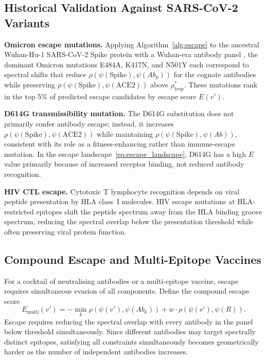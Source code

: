 \documentclass[twocolumn,11pt,a4paper]{article}
\theoremstyle{definition}
\theoremstyle{remark}
\begin{document}
\subsection{Historical Validation Against SARS-CoV-2 Variants}

\noindent\textbf{Omicron escape mutations.} Applying
Algorithm~\ref{alg:escape} to the ancestral Wuhan-Hu-1 SARS-CoV-2 Spike
protein with a Wuhan-era antibody panel \citep{cameroni2022}, the dominant
Omicron mutations E484A, K417N, and N501Y each correspond to spectral shifts
that reduce $\rho(\psi(\text{Spike}), \psi(Ab_k))$ for the cognate antibodies
while preserving $\rho(\psi(\text{Spike}), \psi(\text{ACE2}))$ above
$\rho^*_{\text{trop}}$. These mutations rank in the top 5\% of predicted
escape candidates by escape score $E(v')$.

\medskip\noindent\textbf{D614G transmissibility mutation.} The D614G
substitution \citep{korber2020} does not primarily confer antibody escape;
instead, it increases $\rho(\psi(\text{Spike}), \psi(\text{ACE2}))$ while
maintaining $\rho(\psi(\text{Spike}), \psi(Ab))$, consistent with its role as
a fitness-enhancing rather than immune-escape mutation. In the escape
landscape~\eqref{eq:escape_landscape}, D614G has a high $E$ value primarily
because of increased receptor binding, not reduced antibody recognition.

\medskip\noindent\textbf{HIV CTL escape.} Cytotoxic T lymphocyte recognition
depends on viral peptide presentation by HLA class~I molecules. HIV escape
mutations at HLA-restricted epitopes \citep{allen2004} shift the peptide
spectrum away from the HLA binding groove spectrum, reducing the spectral
overlap below the presentation threshold while often preserving viral protein
function.

\subsection{Compound Escape and Multi-Epitope Vaccines}

For a cocktail of neutralising antibodies or a multi-epitope vaccine, escape
requires simultaneous evasion of all components. Define the compound escape
score
\begin{equation}
  E_{\text{multi}}(v') = -\min_k \rho\!\left(\psi(v'), \psi(Ab_k)\right)
    + w \cdot \rho\!\left(\psi(v'), \psi(R)\right).
  \label{eq:compound_escape}
\end{equation}
Escape requires reducing the spectral overlap with every antibody in the panel
below threshold simultaneously. Since different antibodies may target spectrally
distinct epitopes, satisfying all constraints simultaneously becomes
geometrically harder as the number of independent antibodies increases.
\end{document}
